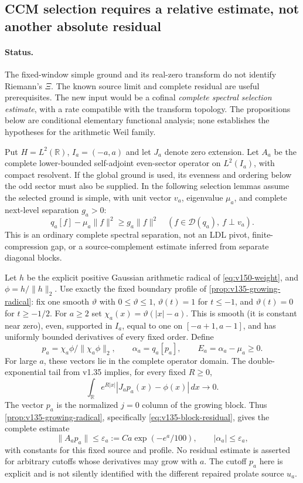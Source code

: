 
\subsection*{CCM selection requires a relative estimate, not another absolute residual}

\paragraph{Status.}
The fixed-window simple ground and its real-zero transform do not identify
Riemann's $\Xi$. The known source limit and complete residual are useful
prerequisites. The new input would be a cofinal \emph{complete spectral
selection estimate}, with a rate compatible with the transform topology.
The propositions below are conditional elementary functional analysis;
none establishes the hypotheses for the arithmetic Weil family.

Put $H=L^2(\mathbb R)$, $I_a=(-a,a)$ and let $J_a$ denote zero extension.
Let $A_a$ be the complete lower-bounded self-adjoint even-sector operator
on $L^2(I_a)$, with compact resolvent. If the global ground is used,
its evenness and ordering below the odd sector must also be supplied.
In the following selection lemmas assume the selected ground is simple,
with unit vector $v_a$, eigenvalue $\mu_a$, and complete next-level
separation $g_a>0$:
\[
 q_a[f]-\mu_a\|f\|^2\ge g_a\|f\|^2
 \quad(f\in\mathcal D(q_a),\ f\perp v_a).
\]
This is an ordinary complete spectral separation, not an LDL pivot,
finite-compression gap, or a source-complement estimate inferred from
separate diagonal blocks.

Let $h$ be the explicit positive Gaussian arithmetic radical of
\eqref{eq:v150-weight}, and $\phi=h/\|h\|_2$. Use exactly the fixed
boundary profile of \ref{prop:v135-growing-radical}: fix one smooth
$\vartheta$ with $0\le\vartheta\le1$, $\vartheta(t)=1$ for $t\le-1$,
and $\vartheta(t)=0$ for $t\ge-1/2$. For $a\ge2$ set
$\chi_a(x)=\vartheta(|x|-a)$. This is smooth (it is constant near zero),
even, supported in $I_a$, equal to one on $[-a+1,a-1]$, and has
uniformly bounded derivatives of every fixed order. Define
\[
 p_a=\chi_a\phi/\|\chi_a\phi\|_2,\qquad
 \alpha_a=q_a[p_a],\qquad E_a=\alpha_a-\mu_a\ge0.
\]
For large $a$, these vectors lie in the complete operator domain.
The double-exponential tail from v1.35 implies, for every fixed $R\ge0$,
\[
 \int_{\mathbb R}e^{R|x|}|J_ap_a(x)-\phi(x)|\,dx\longrightarrow0.
\]
The vector $p_a$ is the normalized $j=0$ column of the growing block.
Thus \ref{prop:v135-growing-radical}, specifically
\eqref{eq:v135-block-residual}, gives the complete estimate
\[
 \|A_ap_a\|\le\varepsilon_a:=Ca\exp(-e^a/100),\qquad
 |\alpha_a|\le\varepsilon_a,
\]
with constants for this fixed source and profile. No residual estimate
is asserted for arbitrary cutoffs whose derivatives may grow with $a$.
The cutoff $p_a$ here is explicit and is not silently identified with
the different repaired prolate source $u_a$.


